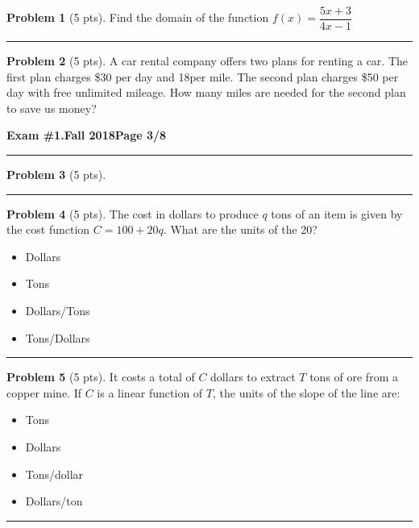 \documentclass[12pt]{article}
\makeatletter
\theoremstyle{definition}
\newtheorem{problem}{Problem}
\newcommand*{\radiobutton}{%
  \@ifstar{\@radiobutton0}{\@radiobutton1}%
}
\newcommand*{\@radiobutton}[1]{%
  \begin{tikzpicture}
    \pgfmathsetlengthmacro\radius{height("X")/2}
    \draw[radius=\radius] circle;
    \ifcase#1 \fill[radius=.6*\radius] circle;\fi
  \end{tikzpicture}%
}
\makeatother
\begin{document}
\begin{problem}[5 pts]
  Find the domain of the function $f(x) = \dfrac{5x+3}{4x-1}$

  \vspace{3cm}
\end{problem}
\hrule

\begin{problem}[5 pts]
  A car rental company offers two plans for renting a car.  The first plan charges \$30 per day and 18\textcent per
  mile.  The second plan charges \$50 per day with free unlimited mileage.  How many miles are needed for the second
  plan to save us money?
\end{problem}

\newpage

\hfill{\large\bf Exam \#1.}\hfill{\large\bf  Fall 2018}\hfill{\large\bf Page 3/8}\hrule

\bigskip
\begin{problem}[5 pts]
  
\end{problem}
\hrule

\begin{problem}[5 pts]
  The cost in dollars to produce $q$ tons of an item is given by the cost function $C = 100 + 20q$. What are the units of
  the 20? 
  \begin{itemize}
  \item[\radiobutton] Dollars
  \item[\radiobutton] Tons
  \item[\radiobutton] Dollars/Tons
  \item[\radiobutton] Tons/Dollars
  \end{itemize} 
\end{problem}
\hrule

\begin{problem}[5 pts]
  It costs a total of $C$ dollars to extract $T$ tons of ore from a copper mine. If $C$ is a linear function of $T$, the
  units of the slope of the line are: 
  \begin{itemize}
  \item[\radiobutton] Tons
  \item[\radiobutton] Dollars
  \item[\radiobutton] Tons/dollar
  \item[\radiobutton] Dollars/ton
  \end{itemize}
\end{problem}
\hrule
\end{document}
